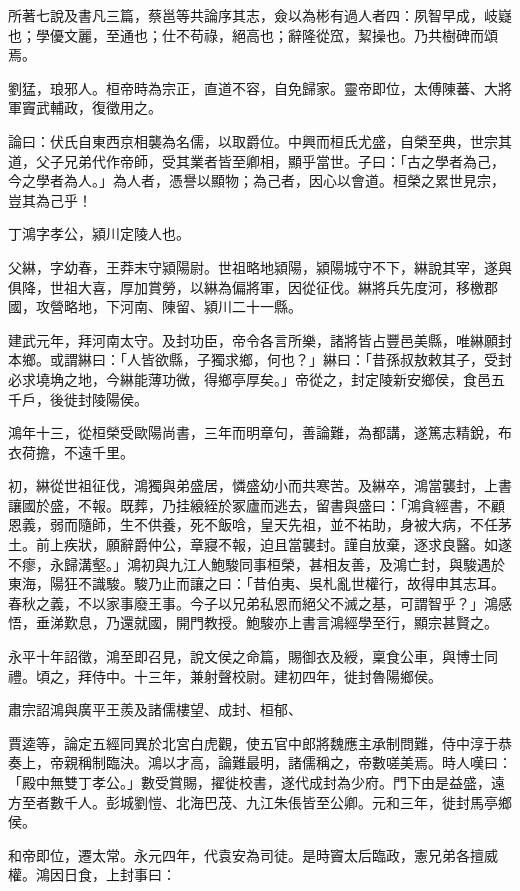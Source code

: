\begin{pinyinscope}
所著七說及書凡三篇，蔡邕等共論序其志，僉以為彬有過人者四：夙智早成，岐嶷也；學優文麗，至通也；仕不苟祿，絕高也；辭隆從窊，絜操也。乃共樹碑而頌焉。

劉猛，琅邪人。桓帝時為宗正，直道不容，自免歸家。靈帝即位，太傅陳蕃、大將軍竇武輔政，復徵用之。

論曰：伏氏自東西京相襲為名儒，以取爵位。中興而桓氏尤盛，自榮至典，世宗其道，父子兄弟代作帝師，受其業者皆至卿相，顯乎當世。子曰：「古之學者為己，今之學者為人。」為人者，憑譽以顯物；為己者，因心以會道。桓榮之累世見宗，豈其為己乎！

丁鴻字孝公，潁川定陵人也。

父綝，字幼春，王莽末守潁陽尉。世祖略地潁陽，潁陽城守不下，綝說其宰，遂與俱降，世祖大喜，厚加賞勞，以綝為偏將軍，因從征伐。綝將兵先度河，移檄郡國，攻營略地，下河南、陳留、潁川二十一縣。

建武元年，拜河南太守。及封功臣，帝令各言所樂，諸將皆占豐邑美縣，唯綝願封本鄉。或謂綝曰：「人皆欲縣，子獨求鄉，何也？」綝曰：「昔孫叔敖敕其子，受封必求墝埆之地，今綝能薄功微，得鄉亭厚矣。」帝從之，封定陵新安鄉侯，食邑五千戶，後徙封陵陽侯。

鴻年十三，從桓榮受歐陽尚書，三年而明章句，善論難，為都講，遂篤志精銳，布衣荷擔，不遠千里。

初，綝從世祖征伐，鴻獨與弟盛居，憐盛幼小而共寒苦。及綝卒，鴻當襲封，上書讓國於盛，不報。既葬，乃挂縗絰於冢廬而逃去，留書與盛曰：「鴻貪經書，不顧恩義，弱而隨師，生不供養，死不飯唅，皇天先祖，並不祐助，身被大病，不任茅土。前上疾狀，願辭爵仲公，章寢不報，迫且當襲封。謹自放棄，逐求良醫。如遂不瘳，永歸溝壑。」鴻初與九江人鮑駿同事桓榮，甚相友善，及鴻亡封，與駿遇於東海，陽狂不識駿。駿乃止而讓之曰：「昔伯夷、吳札亂世權行，故得申其志耳。春秋之義，不以家事廢王事。今子以兄弟私恩而絕父不滅之基，可謂智乎？」鴻感悟，垂涕歎息，乃還就國，開門教授。鮑駿亦上書言鴻經學至行，顯宗甚賢之。

永平十年詔徵，鴻至即召見，說文侯之命篇，賜御衣及綬，稟食公車，與博士同禮。頃之，拜侍中。十三年，兼射聲校尉。建初四年，徙封魯陽鄉侯。

肅宗詔鴻與廣平王羨及諸儒樓望、成封、桓郁、

賈逵等，論定五經同異於北宮白虎觀，使五官中郎將魏應主承制問難，侍中淳于恭奏上，帝親稱制臨決。鴻以才高，論難最明，諸儒稱之，帝數嗟美焉。時人嘆曰：「殿中無雙丁孝公。」數受賞賜，擢徙校書，遂代成封為少府。門下由是益盛，遠方至者數千人。彭城劉愷、北海巴茂、九江朱倀皆至公卿。元和三年，徙封馬亭鄉侯。

和帝即位，遷太常。永元四年，代袁安為司徒。是時竇太后臨政，憲兄弟各擅威權。鴻因日食，上封事曰：


\end{pinyinscope}
